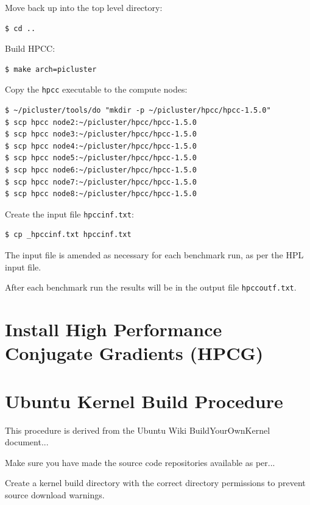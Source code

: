 \documentclass{report}
\begin{document}
Move back up into the top level directory:

\lstset{style=type}
\begin{lstlisting}
$ cd ..
\end{lstlisting}

Build HPCC:

\lstset{style=type}
\begin{lstlisting}
$ make arch=picluster
\end{lstlisting}

Copy the \verb|hpcc| executable to the compute nodes:

\lstset{style=type}
\begin{lstlisting}
$ ~/picluster/tools/do "mkdir -p ~/picluster/hpcc/hpcc-1.5.0"
$ scp hpcc node2:~/picluster/hpcc/hpcc-1.5.0
$ scp hpcc node3:~/picluster/hpcc/hpcc-1.5.0
$ scp hpcc node4:~/picluster/hpcc/hpcc-1.5.0
$ scp hpcc node5:~/picluster/hpcc/hpcc-1.5.0
$ scp hpcc node6:~/picluster/hpcc/hpcc-1.5.0
$ scp hpcc node7:~/picluster/hpcc/hpcc-1.5.0
$ scp hpcc node8:~/picluster/hpcc/hpcc-1.5.0
\end{lstlisting}

Create the input file \verb|hpccinf.txt|:

\lstset{style=type}
\begin{lstlisting}
$ cp _hpccinf.txt hpccinf.txt
\end{lstlisting}

The input file is amended as necessary for each benchmark run, as per the HPL input file.

After each benchmark run the results will be in the output file \verb|hpccoutf.txt|.



%
%
\chapter{Install High Performance Conjugate Gradients (HPCG)}


%
%
\chapter{Ubuntu Kernel Build Procedure}

This procedure is derived from the Ubuntu Wiki BuildYourOwnKernel document...

Make sure you have made the source code repositories available as per...

Create a kernel build directory with the correct directory permissions to prevent source download warnings. 
\end{document}
